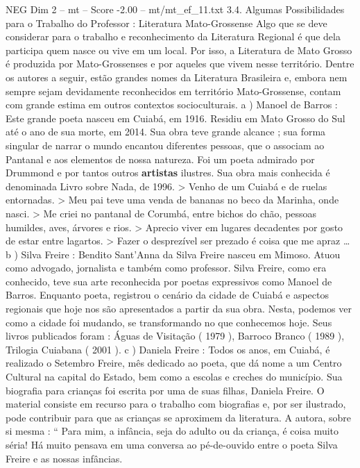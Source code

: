 \begin{textsample}{NEG Dim 2 – mt – Score -2.00 – mt/mt\_ef\_11.txt}  \label{ex:f2_neg_067}
3.4.
Algumas Possibilidades para o Trabalho do Professor : Literatura Mato-Grossense Algo que se deve considerar para o trabalho e reconhecimento da Literatura Regional é que dela participa quem nasce ou vive em um local.
Por isso, a Literatura de Mato Grosso é produzida por Mato-Grossenses e por aqueles que vivem nesse território.
Dentre os autores a seguir, estão grandes nomes da Literatura Brasileira e, embora nem sempre sejam devidamente reconhecidos em território Mato-Grossense, contam com grande estima em outros contextos socioculturais. a ) Manoel de Barros : Este grande poeta nasceu em Cuiabá, em 1916.
Residiu em Mato Grosso do Sul até o ano de sua morte, em 2014.
Sua obra teve grande alcance ; sua forma singular de narrar o mundo encantou diferentes pessoas, que o associam ao Pantanal e aos elementos de nossa natureza.
Foi um poeta admirado por Drummond e por tantos outros \textbf{artistas} ilustres.
Sua obra mais conhecida é denominada Livro sobre Nada, de 1996. > Venho de um Cuiabá e de ruelas entornadas. > Meu pai teve uma venda de bananas no beco da Marinha, onde nasci. > Me criei no pantanal de Corumbá, entre bichos do chão, pessoas humildes, aves, árvores e rios. > Aprecio viver em lugares decadentes por gosto de estar entre lagartos. > Fazer o desprezível ser prezado é coisa que me apraz … b ) Silva Freire : Bendito Sant’Anna da Silva Freire nasceu em Mimoso.
Atuou como advogado, jornalista e também como professor.
Silva Freire, como era conhecido, teve sua arte reconhecida por poetas expressivos como Manoel de Barros.
Enquanto poeta, registrou o cenário da cidade de Cuiabá e aspectos regionais que hoje nos são apresentados a partir da sua obra.
Nesta, podemos ver como a cidade foi mudando, se transformando no que conhecemos hoje.
Seus livros publicados foram : Águas de Visitação ( 1979 ), Barroco Branco ( 1989 ), Trilogia Cuiabana ( 2001 ). c ) Daniela Freire : Todos os anos, em Cuiabá, é realizado o Setembro Freire, mês dedicado ao poeta, que dá nome a um Centro Cultural na capital do Estado, bem como a escolas e creches do município.
Sua biografia para crianças foi escrita por uma de suas filhas, Daniela Freire.
O material consiste em recurso para o trabalho com biografias e, por ser ilustrado, pode contribuir para que as crianças se aproximem da literatura.
A autora, sobre si mesma : “ Para mim, a infância, seja do adulto ou da criança, é coisa muito séria!
Há muito pensava em uma conversa ao pé-de-ouvido entre o poeta Silva Freire e as nossas infâncias.

\end{textsample}
